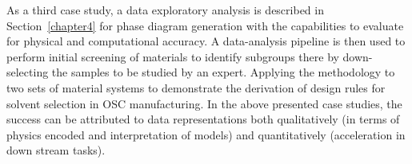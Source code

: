 As a third case study, a data exploratory analysis is described in Section~\ref{chapter4} for phase diagram generation with the capabilities to evaluate for physical and computational accuracy. 
A data-analysis pipeline is then used to perform initial screening of materials to identify subgroups there by down-selecting the samples to be studied by an expert.
Applying the methodology to two sets of material systems to demonstrate the derivation of design rules for solvent selection in OSC manufacturing.
In the above presented case studies, the success can be attributed to data representations both qualitatively (in terms of physics encoded and interpretation of models) and quantitatively (acceleration in down stream tasks).